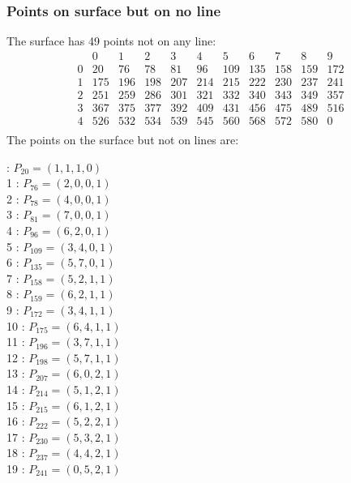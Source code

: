 \documentclass{article}
\begin{document}
{\subsubsection*{Points on surface but on no line}
The surface has 49 points not on any line:\\
$$
\begin{array}{r|*{10}{r}}
 & 0 & 1 & 2 & 3 & 4 & 5 & 6 & 7 & 8 & 9\\
\hline
0 & 20 & 76 & 78 & 81 & 96 & 109 & 135 & 158 & 159 & 172\\
1 & 175 & 196 & 198 & 207 & 214 & 215 & 222 & 230 & 237 & 241\\
2 & 251 & 259 & 286 & 301 & 321 & 332 & 340 & 343 & 349 & 357\\
3 & 367 & 375 & 377 & 392 & 409 & 431 & 456 & 475 & 489 & 516\\
4 & 526 & 532 & 534 & 539 & 545 & 560 & 568 & 572 & 580 & 0\\
\end{array}
$$
The points on the surface but not on lines are:\\
\begin{multicols}{2}
 : $P_{20}=( 1, 1, 1, 0 )$\\
1 : $P_{76}=( 2, 0, 0, 1 )$\\
2 : $P_{78}=( 4, 0, 0, 1 )$\\
3 : $P_{81}=( 7, 0, 0, 1 )$\\
4 : $P_{96}=( 6, 2, 0, 1 )$\\
5 : $P_{109}=( 3, 4, 0, 1 )$\\
6 : $P_{135}=( 5, 7, 0, 1 )$\\
7 : $P_{158}=( 5, 2, 1, 1 )$\\
8 : $P_{159}=( 6, 2, 1, 1 )$\\
9 : $P_{172}=( 3, 4, 1, 1 )$\\
10 : $P_{175}=( 6, 4, 1, 1 )$\\
11 : $P_{196}=( 3, 7, 1, 1 )$\\
12 : $P_{198}=( 5, 7, 1, 1 )$\\
13 : $P_{207}=( 6, 0, 2, 1 )$\\
14 : $P_{214}=( 5, 1, 2, 1 )$\\
15 : $P_{215}=( 6, 1, 2, 1 )$\\
16 : $P_{222}=( 5, 2, 2, 1 )$\\
17 : $P_{230}=( 5, 3, 2, 1 )$\\
18 : $P_{237}=( 4, 4, 2, 1 )$\\
19 : $P_{241}=( 0, 5, 2, 1 )$\\

\end{multicols}}
\end{document}
